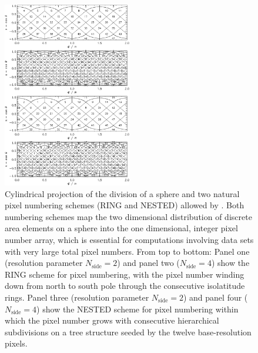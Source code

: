\documentclass[12pt,twoside]{article}
\newcommand{\htmlfigwidth}{0.5\textwidth}
\newcommand{\nside}{N_{\mathrm{side}}}
\begin{document}
\begin{figure} [!ht]
{\centerline{\includegraphics[width=\htmlfigwidth]{fig/introf2}}
}
\caption[Cylindrical projection]%
{\label{fig:Numbering}%
Cylindrical projection of the \healpix  division of a
sphere and two natural pixel numbering schemes (RING and NESTED) 
allowed by \healpixns. Both numbering schemes map the two dimensional 
distribution
of discrete area elements on a sphere into the one dimensional, 
integer pixel number array,
which is essential for computations involving data sets with very 
large total pixel numbers.
From top to bottom:
Panel one (resolution parameter $\nside = 2$) and panel two ($\nside = 4$)
show the RING scheme for pixel numbering, with the pixel number winding 
down from north to south pole through the consecutive isolatitude rings.
Panel three (resolution parameter $\nside = 2$) and panel four ($\nside = 4$)
show the NESTED scheme for pixel numbering within which the pixel number grows
with consecutive hierarchical subdivisions on a tree structure seeded by 
the twelve 
base-resolution pixels. 
}
\end{figure}
\end{document}
